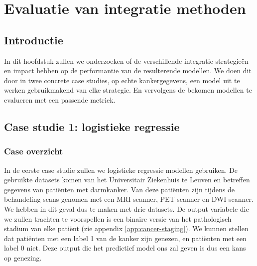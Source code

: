 \chapter{Evaluatie van integratie methoden}
\label{cha:D:evaluatie}

\section{Introductie}
\label{sec:D:evaluatie-introductie}
In dit hoofdstuk zullen we onderzoeken of de verschillende integratie strategie\"en en impact hebben op de performantie van de resulterende modellen. We doen dit door in twee concrete case studies, op echte kankergegevens, een model uit te werken gebruikmakend van elke strategie. En vervolgens de bekomen modellen te evalueren met een passende metriek.

\section{Case studie 1: logistieke regressie}
\subsection{Case overzicht}
In de eerste case studie zullen we logistieke regressie modellen gebruiken. De gebruikte datasets komen van het Universitair Ziekenhuis te Leuven en betreffen gegevens van pati\"enten met darmkanker. Van deze pati\"enten zijn tijdens de behandeling scans genomen met een MRI scanner, PET scanner en DWI scanner. We hebben in dit geval dus te maken met drie datasets. De output variabele die we zullen trachten te voorspellen is een binaire versie van het pathologisch stadium van elke pati\"ent (zie appendix \ref{app:cancer-staging}). We kunnen stellen dat pati\"enten met een label 1 van de kanker zijn genezen, en pati\"enten met een label 0 niet. Deze output die het predictief model ons zal geven is dus een kans op genezing.
